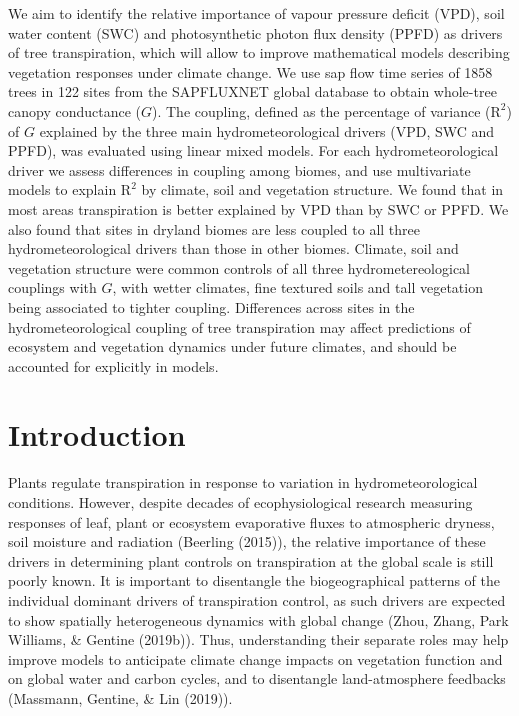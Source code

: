 \documentclass[11pt,twoside]{reedthesis}
\begin{document}
We aim to identify the relative importance of vapour pressure deficit
(VPD), soil water content (SWC) and photosynthetic photon flux density
(PPFD) as drivers of tree transpiration, which will allow to improve
mathematical models describing vegetation responses under climate
change. We use sap flow time series of 1858 trees in 122 sites from the
SAPFLUXNET global database to obtain whole-tree canopy conductance
(\(G\)). The coupling, defined as the percentage of variance
(\(\text{R}^{2}\)) of \(G\) explained by the three main
hydrometeorological drivers (VPD, SWC and PPFD), was evaluated using
linear mixed models. For each hydrometeorological driver we assess
differences in coupling among biomes, and use multivariate models to
explain \(\text{R}^{2}\) by climate, soil and vegetation structure. We
found that in most areas transpiration is better explained by VPD than
by SWC or PPFD. We also found that sites in dryland biomes are less
coupled to all three hydrometeorological drivers than those in other
biomes. Climate, soil and vegetation structure were common controls of
all three hydrometereological couplings with \(G\), with wetter
climates, fine textured soils and tall vegetation being associated to
tighter coupling. Differences across sites in the hydrometeorological
coupling of tree transpiration may affect predictions of ecosystem and
vegetation dynamics under future climates, and should be accounted for
explicitly in models.\par  \newpage

\section{Introduction}\label{introduction}

Plants regulate transpiration in response to variation in
hydrometeorological conditions. However, despite decades of
ecophysiological research measuring responses of leaf, plant or
ecosystem evaporative fluxes to atmospheric dryness, soil moisture and
radiation (Beerling (2015)), the relative importance of these drivers in
determining plant controls on transpiration at the global scale is still
poorly known. It is important to disentangle the biogeographical
patterns of the individual dominant drivers of transpiration control, as
such drivers are expected to show spatially heterogeneous dynamics with
global change (Zhou, Zhang, Park Williams, \& Gentine (2019b)). Thus,
understanding their separate roles may help improve models to anticipate
climate change impacts on vegetation function and on global water and
carbon cycles, and to disentangle land-atmosphere feedbacks (Massmann,
Gentine, \& Lin (2019)).\par
\end{document}
